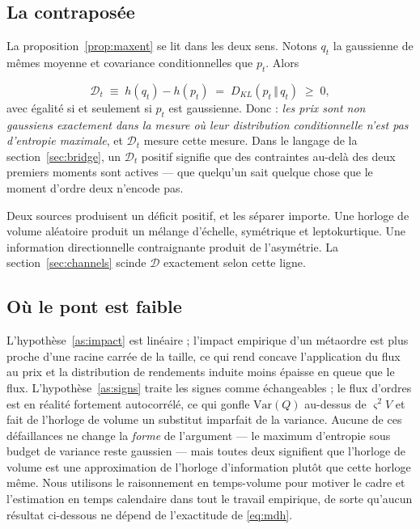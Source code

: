 \documentclass[11pt]{article}
\theoremstyle{definition}
\theoremstyle{remark}
\newcommand{\DD}{\mathcal{D}}
\newcommand{\KL}[2]{D_{KL}\!\left(#1\,\Vert\,#2\right)}
\begin{document}
\subsection{La contraposée}
\label{sec:contrapositive}

La proposition~\ref{prop:maxent} se lit dans les deux sens. Notons $q_t$ la
gaussienne de mêmes moyenne et covariance conditionnelles que $p_t$. Alors

\begin{equation}
\label{eq:deficit}
\DD_t \;\equiv\; h(q_t) - h(p_t) \;=\; \KL{p_t}{q_t} \;\ge\; 0,
\end{equation}
avec égalité si et seulement si $p_t$ est gaussienne. Donc : \emph{les prix sont
non gaussiens exactement dans la mesure où leur distribution conditionnelle n'est
pas d'entropie maximale}, et $\DD_t$ mesure cette mesure. Dans le langage de la
section~\ref{sec:bridge}, un $\DD_t$ positif signifie que des contraintes
au-delà des deux premiers moments sont actives --- que quelqu'un sait quelque
chose que le moment d'ordre deux n'encode pas.

Deux sources produisent un déficit positif, et les séparer importe. Une horloge
de volume aléatoire produit un mélange d'échelle, symétrique et leptokurtique.
Une information directionnelle contraignante produit de l'asymétrie. La
section~\ref{sec:channels} scinde $\DD$ exactement selon cette ligne.

\subsection{Où le pont est faible}
\label{sec:bridge-caveats}

L'hypothèse~\ref{as:impact} est linéaire ; l'impact empirique d'un métaordre est
plus proche d'une racine carrée de la taille, ce qui rend concave l'application
du flux au prix et la distribution de rendements induite moins épaisse en queue
que le flux. L'hypothèse~\ref{as:signs} traite les signes comme échangeables ;
le flux d'ordres est en réalité fortement autocorrélé, ce qui gonfle
$\mathrm{Var}(Q)$ au-dessus de $\varsigma^2 V$ et fait de l'horloge de volume un
substitut imparfait de la variance. Aucune de ces défaillances ne change la
\emph{forme} de l'argument --- le maximum d'entropie sous budget de variance
reste gaussien --- mais toutes deux signifient que l'horloge de volume est une
approximation de l'horloge d'information plutôt que cette horloge même. Nous
utilisons le raisonnement en temps-volume pour motiver le cadre et l'estimation
en temps calendaire dans tout le travail empirique, de sorte qu'aucun résultat
ci-dessous ne dépend de l'exactitude de \eqref{eq:mdh}.
\end{document}
